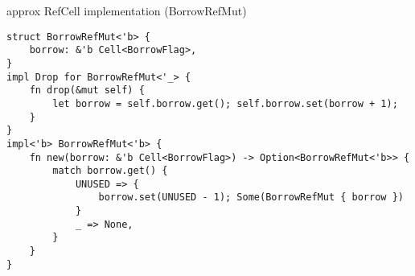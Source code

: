 \begin{frame}[fragile]{approx RefCell implementation (BorrowRefMut)}
\begin{verbatim}
struct BorrowRefMut<'b> {
    borrow: &'b Cell<BorrowFlag>,
}
impl Drop for BorrowRefMut<'_> {
    fn drop(&mut self) {
        let borrow = self.borrow.get(); self.borrow.set(borrow + 1);
    }
}
impl<'b> BorrowRefMut<'b> {
    fn new(borrow: &'b Cell<BorrowFlag>) -> Option<BorrowRefMut<'b>> {
        match borrow.get() {
            UNUSED => {
                borrow.set(UNUSED - 1); Some(BorrowRefMut { borrow })
            }
            _ => None,
        }
    }
}
\end{verbatim}
\end{frame}

